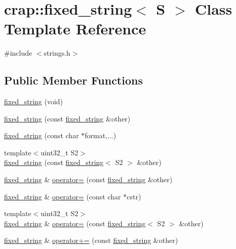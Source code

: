 \hypertarget{classcrap_1_1fixed__string}{\section{crap\+:\+:fixed\+\_\+string$<$ S $>$ Class Template Reference}
\label{classcrap_1_1fixed__string}
}


{\ttfamily \#include $<$strings.\+h$>$}

\subsection*{Public Member Functions}
\begin{DoxyCompactItemize}
\item 
\hyperlink{classcrap_1_1fixed__string_a44a0a2c1ac4b3d7f1cb4895efd736131}{fixed\+\_\+string} (void)
\item 
\hyperlink{classcrap_1_1fixed__string_ae897948db4d98769407a569d3a96b667}{fixed\+\_\+string} (const \hyperlink{classcrap_1_1fixed__string}{fixed\+\_\+string} \&other)
\item 
\hyperlink{classcrap_1_1fixed__string_ad95887a514af9238c02f1864ece86ffa}{fixed\+\_\+string} (const char $\ast$format,...)
\item 
{\footnotesize template$<$uint32\+\_\+t S2$>$ }\\\hyperlink{classcrap_1_1fixed__string_a2f1a4f79c8c81c4987e37b6dc22ea640}{fixed\+\_\+string} (const \hyperlink{classcrap_1_1fixed__string}{fixed\+\_\+string}$<$ S2 $>$ \&other)
\item 
\hyperlink{classcrap_1_1fixed__string}{fixed\+\_\+string} \& \hyperlink{classcrap_1_1fixed__string_acd5df9be5c467dc00c15964ce31732f2}{operator=} (const \hyperlink{classcrap_1_1fixed__string}{fixed\+\_\+string} \&other)
\item 
\hyperlink{classcrap_1_1fixed__string}{fixed\+\_\+string} \& \hyperlink{classcrap_1_1fixed__string_a1d95da4520ec9288b9dbf4093c24d53e}{operator=} (const char $\ast$cstr)
\item 
{\footnotesize template$<$uint32\+\_\+t S2$>$ }\\\hyperlink{classcrap_1_1fixed__string}{fixed\+\_\+string} \& \hyperlink{classcrap_1_1fixed__string_a5d8738a020eed1e5516a333f02a1a002}{operator=} (const \hyperlink{classcrap_1_1fixed__string}{fixed\+\_\+string}$<$ S2 $>$ \&other)
\item 
\hyperlink{classcrap_1_1fixed__string}{fixed\+\_\+string} \& \hyperlink{classcrap_1_1fixed__string_a9aa94a9b0747c6667aaa2a28aa917f6c}{operator+=} (const \hyperlink{classcrap_1_1fixed__string}{fixed\+\_\+string} \&other)

\end{DoxyCompactItemize}
